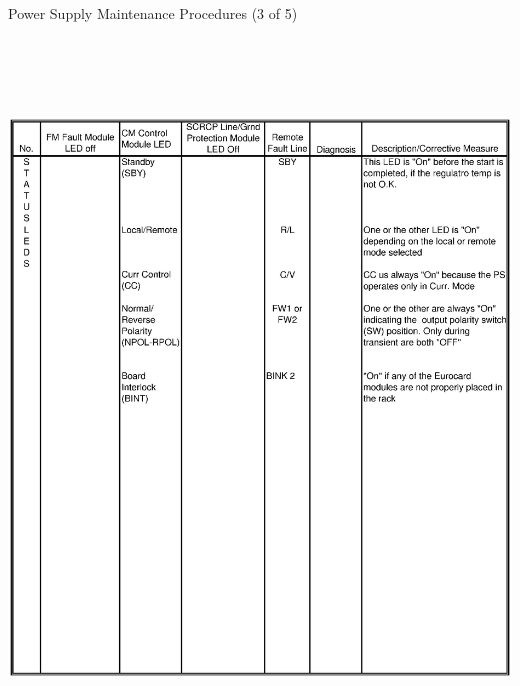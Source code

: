 \clearpage
\begin{table}
\caption{Power Supply Maintenance Procedures (3 of 5) \label{tab:ps_maint_3}}
\includegraphics[height=7.5in,width=6.2in]{book3.ps}
\end{table}

